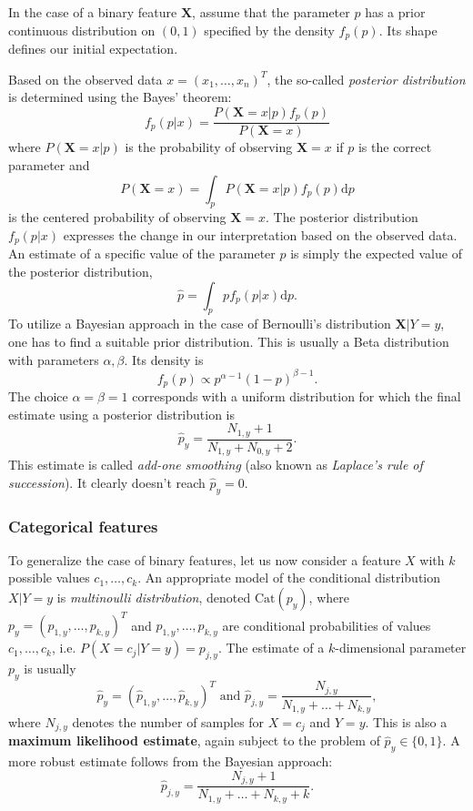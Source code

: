 \documentclass[a4paper]{article}
\begin{document}
	In the case of a binary feature $\boldsymbol{X}$, assume that the
	parameter $p$ has a prior continuous distribution on $(0, 1)$ 
	specified by the density $f_p(p)$. Its shape defines our initial
	expectation.

	Based on the observed data $x = (x_1, \ldots, x_n)^T$, the so-called
	\textit{posterior distribution} is determined using the Bayes'
	theorem:
	\[
		f_p(p | x) = \frac{P(\boldsymbol{X} = x | p) f_p(p)}{P(\boldsymbol{X} = x)}
	\]
	where $P(\boldsymbol{X} = x | p)$ is the probability of observing
	$\boldsymbol{X} = x$ if $p$ is the correct parameter and
	\[
		P(\boldsymbol{X} = x) = \int_p P(\boldsymbol{X} = x | p) f_p(p) \mathrm{d} p
	\]
	is the centered probability of observing $\boldsymbol{X} = x$.
	The posterior distribution $f_p(p|x)$ expresses the change in our
	interpretation based on the observed data. An estimate of a specific
	value of the parameter $p$ is simply the expected value of the
	posterior distribution,
	\[
		\hat{p} = \int_p p f_p(p | x) \mathrm{d} p
	.\]
	To utilize a Bayesian approach in the case of Bernoulli's distribution
	$\boldsymbol{X} | Y = y$, one has to find a suitable prior distribution.
	This is usually a Beta distribution with parameters $\alpha, \beta$.
	Its density is \[
		f_p(p) \varpropto p^{\alpha - 1} (1 - p)^{\beta - 1}
	.\] The choice $\alpha = \beta = 1$ corresponds with a uniform distribution
	for which the final estimate using a posterior distribution is \[
		\hat{p}_y = \frac{N_{1, y} + 1}{N_{1, y} + N_{0, y} + 2}
	.\] This estimate is called \textit{add-one smoothing} (also known as
	\textit{Laplace's rule of succession}). It clearly doesn't reach $\hat{p}_y = 0$.

	\subsubsection{Categorical features}
	To generalize the case of binary features, let us now consider a feature
	$X$ with $k$ possible values $c_1, \ldots, c_k$. An appropriate model of
	the conditional distribution $X|Y = y$ is \textit{multinoulli distribution},
	denoted $\text{Cat}(p_y)$, where $p_y = (p_{1, y}, \ldots, p_{k, y})^T$
	and $p_{1, y}, \ldots, p_{k, y}$ are conditional probabilities of values
	$c_1, \ldots, c_k$, i.e. $P(X = c_j | Y = y) = p_{j, y}$. The estimate
	of a $k$-dimensional parameter $p_y$ is usually \[
		\hat{p}_y = \left( \hat{p}_{1, y}, \ldots, \hat{p}_{k, y} \right)^T
		\text{ and }
		\hat{p}_{j, y} = \frac{N_{j, y}}{N_{1, y} + \ldots + N_{k, y}}
	,\] where $N_{j, y}$ denotes the number of samples for $X = c_j$ and $Y = y$.
	This is also a \textbf{maximum likelihood estimate}, again subject to the
	problem of $\hat{p}_y \in \{0, 1\}$. A more robust estimate follows from
	the Bayesian approach: \[
		\hat{p}_{j, y} = \frac{N_{j, y} + 1}{N_{1, y} + \ldots + N_{k, y} + k}
	.\]
\end{document}
